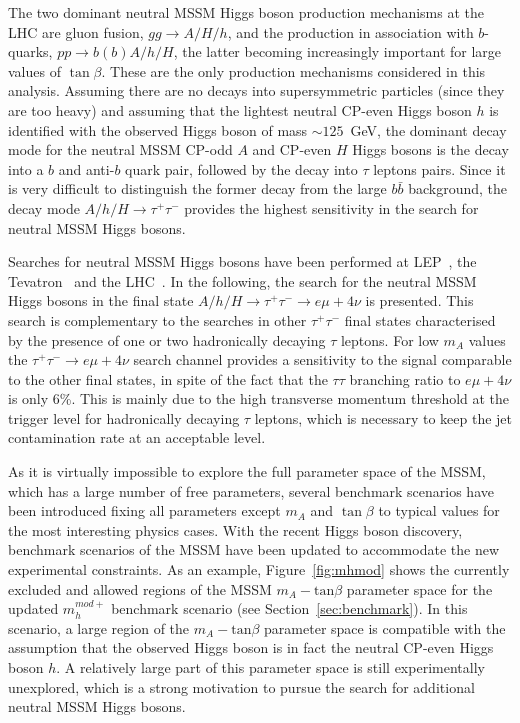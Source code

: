The two dominant neutral MSSM Higgs boson production mechanisms 
at the LHC are gluon fusion, $gg\rightarrow A/H/h$, and 
the production in association with $b$-quarks, $pp \rightarrow b(b)A/h/H$, the latter becoming increasingly 
important for large values of $\tan\beta$. These  are the only production mechanisms
considered in this analysis. 
Assuming there are no decays into supersymmetric particles  (since they are too heavy)
and assuming that the lightest neutral CP-even Higgs boson $h$ is identified with the observed Higgs boson
of mass $\sim 125$~GeV, the dominant decay mode for the neutral MSSM CP-odd $A$ and CP-even $H$ Higgs bosons
 is the decay into a  $b$ and anti-$b$ quark pair, %
followed by the decay into $\tau$ leptons pairs. Since it is very difficult to distinguish the former decay 
from the large $b\bar{b}$ background, the decay mode 
$A/h/H \rightarrow \tau^+ \tau^-$  provides the highest sensitivity in the search for neutral MSSM Higgs bosons.

Searches for neutral MSSM Higgs bosons have been performed at
LEP~\cite{LEPLimits}, the
Tevatron~\cite{TevatronLimits1} and the LHC~\cite{CMSLimit, ATLASLimit}. 
In the following, the search for the neutral MSSM Higgs bosons  in the final state 
$A/h/H \rightarrow \tau^+ \tau^- \rightarrow e \mu +4\nu$ is presented. 
This search is complementary to the searches in other $\tau^+\tau^-$ final states
characterised by the presence of one or two hadronically decaying $\tau$ leptons. For low $m_A$ values
the $\tau^+ \tau^- \rightarrow e \mu +4\nu$ search channel provides a sensitivity to the signal comparable to the 
other final states, in spite of the fact that the $\tau\tau$ branching ratio to $e \mu +4\nu$ is only 6\%. 
This is mainly due to the high transverse momentum threshold at the trigger level for  hadronically decaying $\tau$ leptons,
which is necessary to keep the jet contamination rate at an acceptable level.

As it is virtually impossible to explore the full parameter space of the MSSM, 
which has a large number of free parameters, several benchmark scenarios have been  
introduced  fixing all parameters except $m_A$ and $\tan\beta$  to typical values for the most interesting 
physics cases.
With the recent Higgs boson discovery, benchmark scenarios of the MSSM have been updated to 
accommodate the  new experimental constraints. 
As an example, Figure~\ref{fig:mhmod} shows the currently excluded and allowed regions of the MSSM $m_{A} - \text{tan}\beta$ 
parameter space for the updated  $m_{h}^{mod+}$ benchmark scenario (see Section~\ref{sec:benchmark}). 
In this scenario, a large region of the $m_{A} - \text{tan}\beta$
parameter space is compatible with the assumption that the observed Higgs boson is in fact the 
neutral CP-even  Higgs boson $h$. A relatively large part of this parameter space is still experimentally unexplored,
which is a strong motivation to pursue the search for additional neutral MSSM Higgs bosons.


